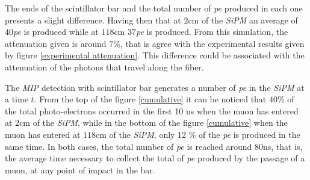 \documentclass[submitting]{nst}
\begin{document}
The ends of the scintillator bar and the total number of \textsl{pe} produced in each one presents a slight difference. Having then that at $2$cm of the \textsl{SiPM} an average of $40$\textsl{pe} is produced while at $118$cm $37$\textsl{pe} is produced. From this simulation, the attenuation given is around $7$\%, that is agree with the experimental results given by figure \ref{experimental attenuation}. This difference could be associated with the attenuation of the photons that travel along the fiber.

The \textsl{MIP} detection with scintillator bar generates a number of \textsl{pe} in the \textsl{SiPM} at a time $t$. From the top of the figure \ref{cumulative} it can be noticed that $40$\% of the total photo-electrons occurred in the first 10 ns when the muon has entered at $2$cm of the \textsl{SiPM},   while in the bottom of the figure \ref{cumulative} when the muon has entered at $118$cm of the \textsl{SiPM},   only 12 \% of the \textsl{pe} is produced in the same time. In both cases, the total number of \textsl{pe} is reached around $80$ns, that is, the average time necessary to collect the total of \textsl{pe} produced by the passage of a muon, at any point of impact in the bar.
\end{document}
